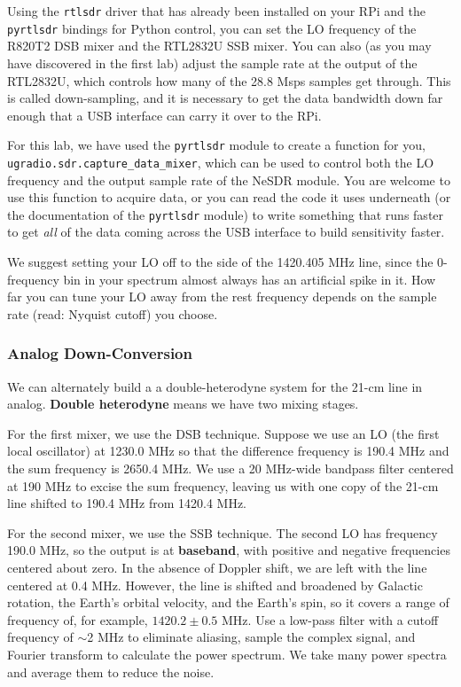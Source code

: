 \documentclass[11pt,preprint]{aastex}
\begin{document}
Using the {\tt rtlsdr} driver that has already been installed on your
RPi and the {\tt pyrtlsdr} bindings for Python control, you can set
the LO frequency of the R820T2 DSB mixer and the RTL2832U SSB mixer.
You can also (as you may have discovered in the first lab) adjust the
sample rate at the output of the RTL2832U, which controls how many of
the 28.8 Msps samples get through. This is called down-sampling, and
it is necessary to get the data bandwidth down far enough that a
USB interface can carry it over to the RPi.

For this lab, we have used the {\tt pyrtlsdr} module to create a
function for you, {\tt ugradio.sdr.capture\_data\_mixer}, which can be
used to control both the LO frequency and the output sample rate of
the NeSDR module. You are welcome to use this function to acquire data,
or you can read the code it uses underneath (or the documentation of
the {\tt pyrtlsdr} module) to write something that runs faster to
get {\it all} of the data coming across the USB interface to build
sensitivity faster.

We suggest setting your LO off to the side of the 1420.405 MHz line,
since the 0-frequency bin in your spectrum almost always has an
artificial spike in it. How far you can tune your LO away from the
rest frequency depends on the sample rate (read: Nyquist cutoff) you
choose.

\subsubsection{Analog Down-Conversion}

\noindent
We can alternately build a a double-heterodyne system 
for the 21-cm line in analog.
{\bf Double heterodyne} means we have two mixing stages.

For the first mixer, we use the DSB technique. Suppose we
  use an LO (the first local oscillator) at 1230.0 MHz so that the
  difference frequency is 190.4 MHz and the sum frequency is 2650.4 MHz.
  We use a 20 MHz-wide bandpass filter centered at 190 MHz to excise
  the sum frequency, leaving us with one copy of the 21-cm line
  shifted to 190.4 MHz from 1420.4 MHz.

For the second mixer, we use the SSB technique. The second
  LO has frequency 190.0 MHz, so the output is at {\bf baseband},
  with positive and negative frequencies centered about zero. In the
  absence of Doppler shift, we are left with the line centered at 0.4
  MHz. However, the line is shifted and broadened by Galactic rotation,
  the Earth's orbital velocity, and the Earth's spin, so it covers a range of frequency
  of, for example, $1420.2 \pm 0.5$ MHz. Use a low-pass filter with a
  cutoff frequency of $\sim$2 MHz to
  eliminate aliasing, sample the complex signal, and Fourier transform
  to calculate the power spectrum. We take many power spectra and
  average them to reduce the noise.
\end{document}

